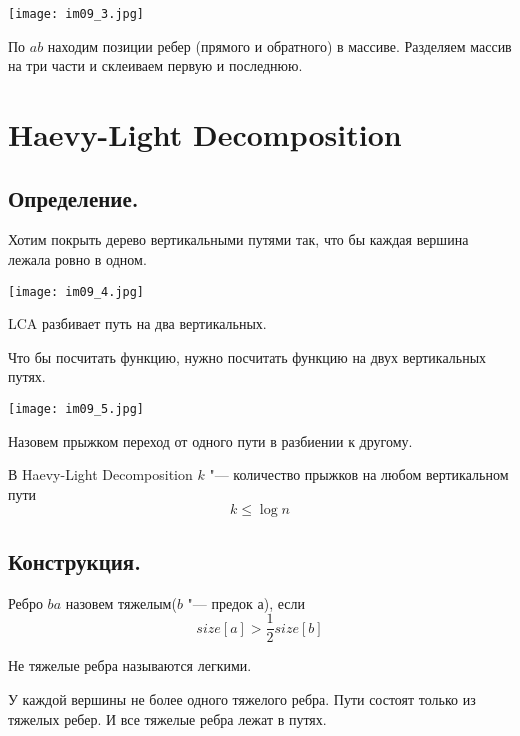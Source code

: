 \begin{center}
\texttt{[image: im09\_3.jpg]}
\end{center}

По $ab$ находим позиции ребер (прямого и обратного) в массиве.
Разделяем массив на три части и склеиваем первую и последнюю.

\section{Haevy-Light Decomposition}

\subsection{Определение.}

Хотим покрыть дерево вертикальными путями так, что бы каждая вершина лежала ровно в одном.

\begin{center}
\texttt{[image: im09\_4.jpg]}
\end{center}

LCA разбивает путь на два вертикальных.

Что бы посчитать функцию, нужно посчитать функцию на двух вертикальных путях.

\begin{center}
\texttt{[image: im09\_5.jpg]}
\end{center}

\begin{Def}
	Назовем прыжком переход от одного пути в разбиении к другому.
\end{Def}

В Haevy-Light Decomposition $k$ "--- количество прыжков на любом вертикальном пути
\[ k \le \log n \]

\subsection{Конструкция.}
\begin{Def}
	Ребро $ba$ назовем тяжелым($b$ "--- предок $а$), если
	\[ size[a] > \frac{1}{2}size[b] \]
\end{Def}
\begin{Def}
	Не тяжелые ребра называются легкими.
\end{Def}

У каждой вершины не более одного тяжелого ребра.
Пути состоят только из тяжелых ребер.
И все тяжелые ребра лежат в путях.

